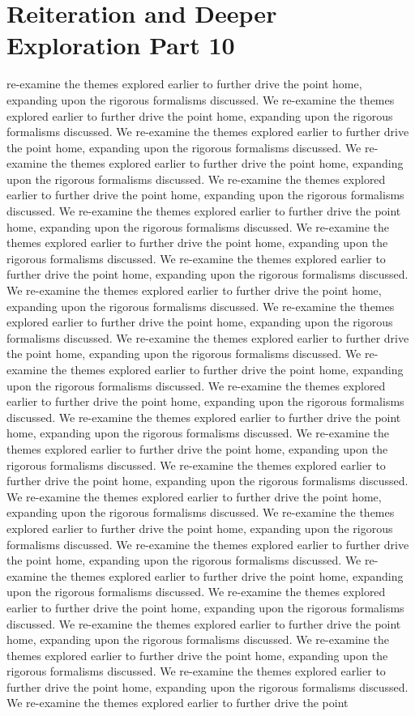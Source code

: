 \section{Reiteration and Deeper Exploration Part 10}\nWe re-examine the themes explored earlier to further drive the point home, expanding upon the rigorous formalisms discussed. We re-examine the themes explored earlier to further drive the point home, expanding upon the rigorous formalisms discussed. We re-examine the themes explored earlier to further drive the point home, expanding upon the rigorous formalisms discussed. We re-examine the themes explored earlier to further drive the point home, expanding upon the rigorous formalisms discussed. We re-examine the themes explored earlier to further drive the point home, expanding upon the rigorous formalisms discussed. We re-examine the themes explored earlier to further drive the point home, expanding upon the rigorous formalisms discussed. We re-examine the themes explored earlier to further drive the point home, expanding upon the rigorous formalisms discussed. We re-examine the themes explored earlier to further drive the point home, expanding upon the rigorous formalisms discussed. We re-examine the themes explored earlier to further drive the point home, expanding upon the rigorous formalisms discussed. We re-examine the themes explored earlier to further drive the point home, expanding upon the rigorous formalisms discussed. We re-examine the themes explored earlier to further drive the point home, expanding upon the rigorous formalisms discussed. We re-examine the themes explored earlier to further drive the point home, expanding upon the rigorous formalisms discussed. We re-examine the themes explored earlier to further drive the point home, expanding upon the rigorous formalisms discussed. We re-examine the themes explored earlier to further drive the point home, expanding upon the rigorous formalisms discussed. We re-examine the themes explored earlier to further drive the point home, expanding upon the rigorous formalisms discussed. We re-examine the themes explored earlier to further drive the point home, expanding upon the rigorous formalisms discussed. We re-examine the themes explored earlier to further drive the point home, expanding upon the rigorous formalisms discussed. We re-examine the themes explored earlier to further drive the point home, expanding upon the rigorous formalisms discussed. We re-examine the themes explored earlier to further drive the point home, expanding upon the rigorous formalisms discussed. We re-examine the themes explored earlier to further drive the point home, expanding upon the rigorous formalisms discussed. We re-examine the themes explored earlier to further drive the point home, expanding upon the rigorous formalisms discussed. We re-examine the themes explored earlier to further drive the point home, expanding upon the rigorous formalisms discussed. We re-examine the themes explored earlier to further drive the point home, expanding upon the rigorous formalisms discussed. We re-examine the themes explored earlier to further drive the point home, expanding upon the rigorous formalisms discussed. We re-examine the themes explored earlier to further drive the point 